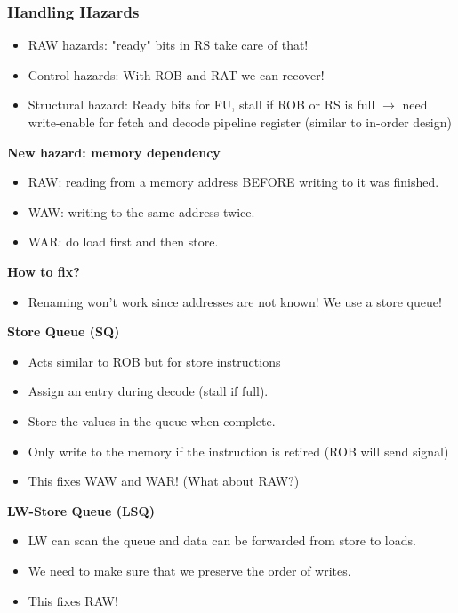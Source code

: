 \documentclass[10pt]{article}
\begin{document}
\subsubsection*{Handling Hazards}
\begin{itemize}
    \item RAW hazards: "ready" bits in RS take care of that!
    \item Control hazards: With ROB and RAT we can recover!
    \item Structural hazard: Ready bits for FU, stall if ROB or RS is full $\rightarrow$ need write-enable for fetch and decode pipeline register (similar to in-order design)
\end{itemize}
\textbf{New hazard: memory dependency}
\begin{itemize}
    \item RAW: reading from a memory address BEFORE writing to it was finished.
    \item WAW: writing to the same address twice.
    \item WAR: do load first and then store.
\end{itemize}
\textbf{How to fix?}
\begin{itemize}
    \item Renaming won't work since addresses are not known!  We use a store queue!
\end{itemize}
\textbf{Store Queue (SQ)}
\begin{itemize}
    \item Acts similar to ROB but for store instructions
    \item Assign an entry during decode (stall if full).
    \item Store the values in the queue when complete.
    \item Only write to the memory if the instruction is retired (ROB will send signal)
    \item This fixes WAW and WAR!  (What about RAW?)
\end{itemize}
\textbf{LW-Store Queue (LSQ)}
\begin{itemize}
    \item LW can scan the queue and data can be forwarded from store to loads.
    \item We need to make sure that we preserve the order of writes.
    \item This fixes RAW!
\end{itemize}
\end{document}
